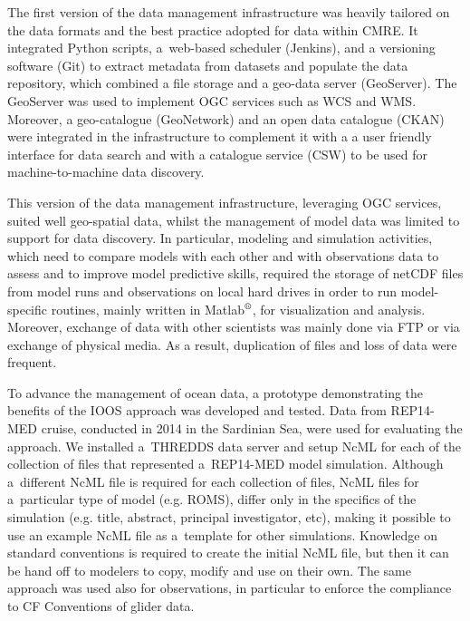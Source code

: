 \documentclass[osd, online, hvmath]{copernicus}
\begin{document}
The first version of the data management infrastructure was heavily tailored on the data formats and the best practice adopted for data within CMRE. It integrated Python scripts, a~web-based scheduler (Jenkins), and a versioning software (Git) to extract metadata from datasets and populate the data repository, which combined a file storage and a geo-data server (GeoServer). The GeoServer was used to implement OGC services such as WCS and WMS. Moreover, a geo-catalogue (GeoNetwork) and an open data catalogue (CKAN) were integrated in the infrastructure to complement it with a a user friendly interface for data search and with a catalogue service (CSW) to be used for machine-to-machine data discovery. 

This version of the data management infrastructure, leveraging OGC services, suited well geo-spatial data, whilst the management of model data was limited to support for data discovery. In particular, modeling and simulation activities, which need to compare models with each other and with observations data to assess and to improve model predictive skills, required the storage of netCDF files from model runs and observations on local hard drives in order to run model-specific routines, mainly written in Matlab$^{\text{\textregistered}}$, for visualization and analysis. Moreover, exchange of data with other scientists was mainly done via FTP or via exchange of physical media. As a result, duplication of files and loss of data were frequent. 

To advance the management of ocean data, a prototype demonstrating the benefits of the IOOS approach was developed and tested.  
Data from REP14-MED cruise, conducted in 2014 in the Sardinian Sea, were used for evaluating the approach. 
We installed a~THREDDS data server and setup NcML for each of the collection of files that represented a~REP14-MED model simulation. 
Although a~different NcML file is required for each collection of files, NcML files for a~particular type of model (e.g. ROMS), differ only in the specifics of the simulation (e.g. title, abstract, principal investigator, etc), making it possible to use an example NcML file as a~template for other simulations. 
Knowledge on standard conventions is required to create the initial NcML file, but then it can be hand off to modelers to copy, modify and use on their own.
The same approach was used also for observations, in particular to enforce the compliance to CF Conventions of glider data. 
\end{document}
